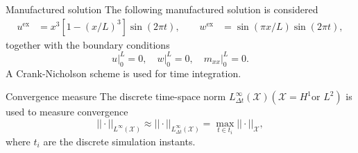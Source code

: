 \documentclass[aspectratio=169]{beamer}
\begin{document}
\begin{frame}{Manufactured solution}
	The following manufactured solution is considered
	\begin{equation*}
		\begin{aligned}
			u^{\text{ex}} &= x^3[1-(x/L)^3] \sin(2 \pi t), \qquad
			w^{\text{ex}} &= \sin(\pi x/L)\sin(2 \pi t), 
		\end{aligned}
	\end{equation*}
	together with the boundary conditions
	\begin{equation*}
		u\vert_0^L = 0, \quad w\vert_0^L =0, \quad m_{xx}\vert_{0}^L=0.
	\end{equation*}
A Crank-Nicholson scheme is used for time integration.
\begin{block}{Convergence measure}
	The discrete time-space norm $L^\infty_{\Delta t} (\mathcal{X}) (\mathcal{X} = H^1 \text{or } L^2)$ is used to measure convergence
	\[
	||\cdot ||_{L^\infty (\mathcal{X})} \approx || \cdot ||_{L^\infty_{\Delta t} (\mathcal{X})} = \max_{t \in t_i} ||\cdot||_{\mathcal{X}},
	\]
	where $t_i$ are the discrete simulation instants.
\end{block}

\end{frame}
\end{document}
